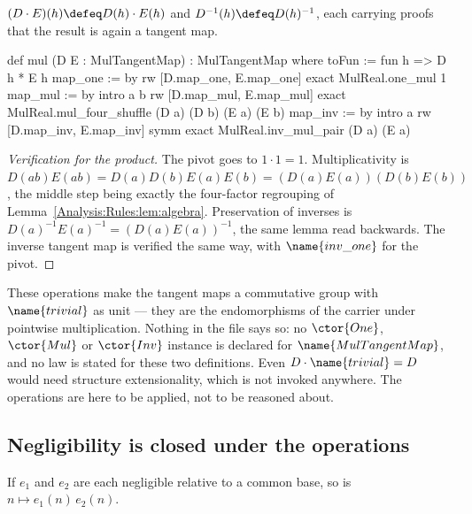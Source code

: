 \begin{definition}
\label{Analysis:Rules:def:tangent-ops}
$(D \cdot E)(h) \defeq D(h) \cdot E(h)$ and $D^{-1}(h) \defeq D(h)^{-1}$, each
carrying proofs that the result is again a tangent map.
\end{definition}

\begin{leancode}
def mul (D E : MulTangentMap) : MulTangentMap where
  toFun := fun h => D h * E h
  map_one := by
    rw [D.map_one, E.map_one]
    exact MulReal.one_mul 1
  map_mul := by
    intro a b
    rw [D.map_mul, E.map_mul]
    exact MulReal.mul_four_shuffle (D a) (D b) (E a) (E b)
  map_inv := by
    intro a
    rw [D.map_inv, E.map_inv]
    symm
    exact MulReal.inv_mul_pair (D a) (E a)
\end{leancode}

\begin{proof}[Verification for the product]
The pivot goes to $1 \cdot 1 = 1$.  Multiplicativity is
$D(ab)E(ab) = D(a)D(b)E(a)E(b) = (D(a)E(a))(D(b)E(b))$, the middle step being
exactly the four-factor regrouping of
Lemma~\ref{Analysis:Rules:lem:algebra}.  Preservation of inverses is
$D(a)^{-1}E(a)^{-1} = (D(a)E(a))^{-1}$, the same lemma read backwards.  The
inverse tangent map is verified the same way, with
$\name{inv\_one}$ for the pivot.
\end{proof}

\begin{remark}
\label{Analysis:Rules:rem:tangent-group}
These operations make the tangent maps a commutative group with
$\name{trivial}$ as unit --- they are the endomorphisms of the carrier under
pointwise multiplication.  Nothing in the file says so: no
$\ctor{One}$, $\ctor{Mul}$ or $\ctor{Inv}$ instance is declared for
$\name{MulTangentMap}$, and no law is stated for these two definitions.  Even
$D \cdot \name{trivial} = D$ would need structure extensionality, which is not
invoked anywhere.  The operations are here to be applied, not to be reasoned
about.
\end{remark}

\subsection{Negligibility is closed under the operations}

\begin{theorem}\label{Analysis:Rules:thm:negligible-mul}
If $e_1$ and $e_2$ are each negligible relative to a common base, so is
$n \mapsto e_1(n)\,e_2(n)$.
\end{theorem}

